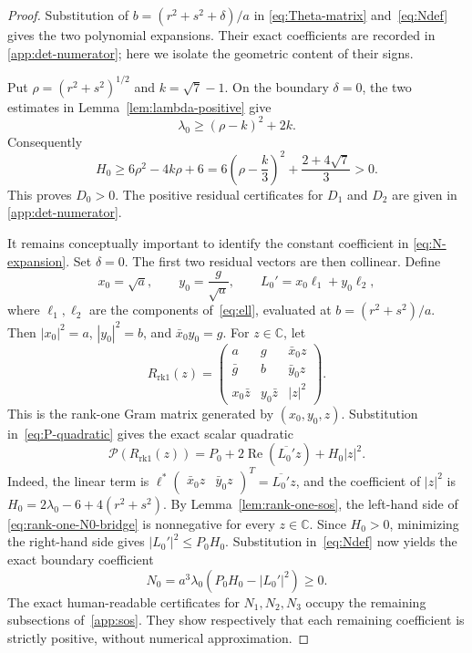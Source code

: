 \documentclass[10pt,twoside]{siamart1116}
\newcommand{\CC}{\mathbb C}
\newcommand{\Rea}{\operatorname{Re}}
\newcommand{\mat}[1]{\begin{pmatrix}#1\end{pmatrix}}
\begin{document}
\begin{proof}
Substitution of $b=(r^2+s^2+\delta)/a$ in
\eqref{eq:Theta-matrix} and~\eqref{eq:Ndef} gives the two polynomial
expansions.  Their exact coefficients are recorded in
\ref{app:det-numerator}; here we isolate the geometric content of
their signs.

Put
$\rho=(r^2+s^2)^{1/2}$ and $k=\sqrt7-1$.  On the boundary $\delta=0$, the
two estimates in Lemma~\ref{lem:lambda-positive} give
\[
 \lambda_0\geq(\rho-k)^2+2k.
\]
Consequently
\begin{equation}\label{eq:H0-lower}
 H_0\geq6\rho^2-4k\rho+6
 =6\left(\rho-\frac{k}{3}\right)^2+\frac{2+4\sqrt7}{3}>0.
\end{equation}
This proves $D_0>0$.
The positive residual certificates for $D_1$ and $D_2$ are given in
\ref{app:det-numerator}.

It remains conceptually important to identify the constant coefficient in
\eqref{eq:N-expansion}.  Set $\delta=0$.  The first two residual vectors are
then collinear.  Define
\[
 x_0=\sqrt a,\qquad y_0=\frac{g}{\sqrt a},\qquad
 L_0'=x_0\ell_1+y_0\ell_2,
\]
where $\ell_1,\ell_2$ are the components of~\eqref{eq:ell}, evaluated at
$b=(r^2+s^2)/a$.  Then $|x_0|^2=a$, $|y_0|^2=b$, and
$\bar x_0y_0=g$.  For $z\in\CC$, let
\[
 R_{\mathrm{rk1}}(z)=
 \mat{
  a&g&\bar x_0z\\
  \bar g&b&\bar y_0z\\
  x_0\bar z&y_0\bar z&|z|^2
 }.
\]
This is the rank-one Gram matrix generated by $(x_0,y_0,z)$.  Substitution
in~\eqref{eq:P-quadratic} gives the exact scalar quadratic
\begin{equation}\label{eq:rank-one-N0-bridge}
 \mathcal P(R_{\mathrm{rk1}}(z))
 =P_0+2\Rea(\overline{L_0'}z)+H_0|z|^2.
\end{equation}
Indeed, the linear term is
$\ell^*\mat{\bar x_0z&\bar y_0z}^T=\overline{L_0'}z$, and the coefficient
of $|z|^2$ is $H_0=2\lambda_0-6+4(r^2+s^2)$.  By
Lemma~\ref{lem:rank-one-sos}, the left-hand side of
\eqref{eq:rank-one-N0-bridge} is nonnegative for every $z\in\CC$.
Since $H_0>0$, minimizing the right-hand side gives
$|L_0'|^2\leq P_0H_0$.  Substitution in~\eqref{eq:Ndef} now yields the exact
boundary coefficient
\begin{equation}\label{eq:N0-certificate}
 N_0=a^3\lambda_0(P_0H_0-|L_0'|^2)\geq0.
\end{equation}
The exact human-readable certificates for $N_1,N_2,N_3$ occupy the
remaining subsections of~\ref{app:sos}.  They
show respectively that each remaining coefficient is strictly positive,
without numerical approximation.
\end{proof}
\end{document}
